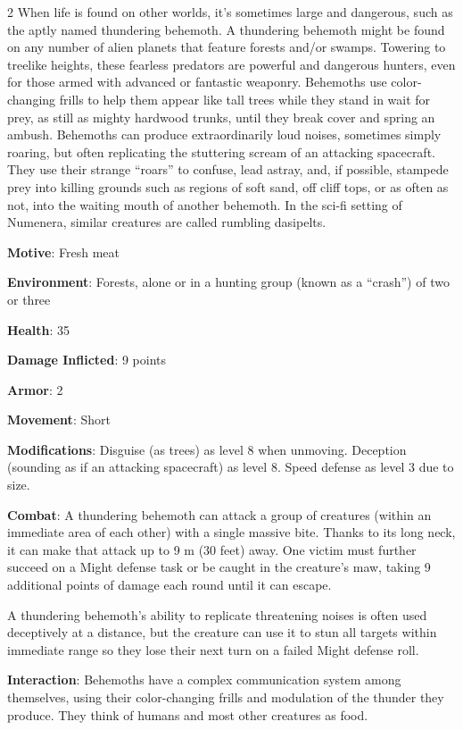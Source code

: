 \begin{multicols}{2}
When life is found on other worlds, it’s sometimes large and dangerous, such as the aptly named thundering behemoth. A thundering behemoth might be found on any number of alien planets that feature forests and/or swamps. Towering to treelike heights, these fearless predators are powerful and dangerous hunters, even for those armed with advanced or fantastic weaponry. Behemoths use color-changing frills to help them appear like tall trees while they stand in wait for prey, as still as mighty hardwood trunks, until they break cover and spring an ambush. Behemoths can produce extraordinarily loud noises, sometimes simply roaring, but often replicating the stuttering scream of an attacking spacecraft. They use their strange “roars” to confuse, lead astray, and, if possible, stampede prey into killing grounds such as regions of soft sand, off cliff tops, or as often as not, into the waiting mouth of another behemoth.
In the sci-fi setting of Numenera, similar creatures are called rumbling dasipelts. 

\textbf{Motive}: Fresh meat 

\textbf{Environment}: Forests, alone or in a hunting group (known as a “crash”) of two or three 

\textbf{Health}: 35 

\textbf{Damage Inflicted}: 9 points 

\textbf{Armor}: 2 

\textbf{Movement}: Short 

\textbf{Modifications}: Disguise (as trees) as level 8 when unmoving. Deception (sounding as if an attacking spacecraft) as level 8. Speed defense as level 3 due to size. 

\textbf{Combat}: A thundering behemoth can attack a group of creatures (within an immediate area of each other) with a single massive bite. Thanks to its long neck, it can make that attack up to 9 m (30 feet) away. One victim must further succeed on a Might defense task or be caught in the creature’s maw, taking 9 additional points of damage each round until it can escape. 

A thundering behemoth’s ability to replicate threatening noises is often used deceptively at a distance, but the creature can use it to stun all targets within immediate range so they lose their next turn on a failed Might defense roll. 

\textbf{Interaction}: Behemoths have a complex communication system among themselves, using their color-changing frills and modulation of the thunder they produce. They think of humans and most other creatures as food. 


\end{multicols}

